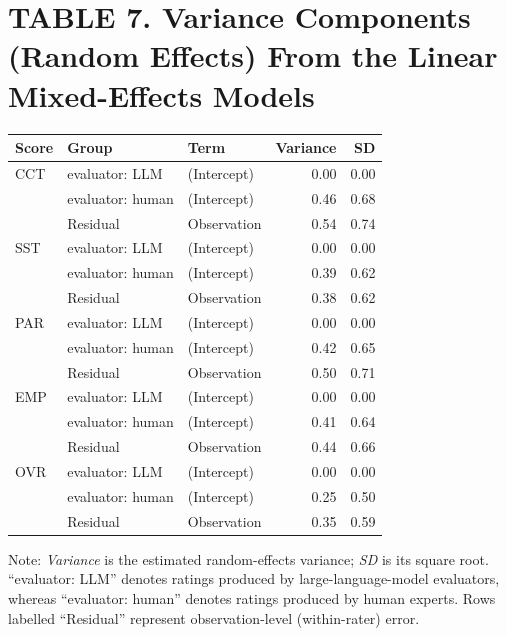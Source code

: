 \documentclass{wiley-article}
\begin{document}
\begin{table}[H] %
  \section*{TABLE 7. Variance Components (Random Effects) From the Linear Mixed-Effects Models}
  \centering
  \footnotesize
  \begin{threeparttable}
    \label{tab:lme_variance}
    \begin{tabular}{l l l r r}
      \toprule
      \textbf{Score} & \textbf{Group} & \textbf{Term} & \textbf{Variance} & \textbf{SD} \\
      \midrule
      CCT & evaluator: LLM   & (Intercept) & 0.00 & 0.00 \\
          & evaluator: human & (Intercept) & 0.46 & 0.68 \\
          & Residual         & Observation & 0.54 & 0.74 \\
      \addlinespace
      SST & evaluator: LLM   & (Intercept) & 0.00 & 0.00 \\
          & evaluator: human & (Intercept) & 0.39 & 0.62 \\
          & Residual         & Observation & 0.38 & 0.62 \\
      \addlinespace
      PAR & evaluator: LLM   & (Intercept) & 0.00 & 0.00 \\
          & evaluator: human & (Intercept) & 0.42 & 0.65 \\
          & Residual         & Observation & 0.50 & 0.71 \\
      \addlinespace
      EMP & evaluator: LLM   & (Intercept) & 0.00 & 0.00 \\
          & evaluator: human & (Intercept) & 0.41 & 0.64 \\
          & Residual         & Observation & 0.44 & 0.66 \\
      \addlinespace
      OVR & evaluator: LLM   & (Intercept) & 0.00 & 0.00 \\
          & evaluator: human & (Intercept) & 0.25 & 0.50 \\
          & Residual         & Observation & 0.35 & 0.59 \\
      \bottomrule
    \end{tabular}
    \begin{tablenotes}
      \scriptsize
      \item Note: \textit{Variance} is the estimated random-effects variance; \textit{SD} is its square root. “evaluator: LLM” denotes ratings produced by large-language-model evaluators, whereas “evaluator: human” denotes ratings produced by human experts. Rows labelled “Residual” represent observation-level (within-rater) error.
    \end{tablenotes}
  \end{threeparttable}
\end{table}
\end{document}
